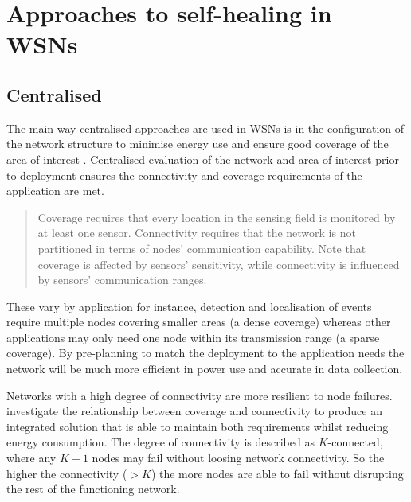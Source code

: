 \documentclass[authoryearcitations]{UoYCSproject}
\begin{document}
\section{Approaches to self-healing in WSNs}



\subsection{Centralised}

The main way centralised approaches are used in WSNs is in the configuration of the network structure to minimise energy use and ensure good coverage of the area of interest \citep{Wang2003,Ding2005,Wang2005,Derr2013}. Centralised evaluation of the network and area of interest prior to deployment ensures the connectivity and coverage requirements of the application are met.
\begin{quote}
Coverage requires that every location in the sensing field is monitored by at least one sensor. Connectivity requires that the network is not partitioned in terms of nodes' communication capability. Note that coverage is affected by sensors' sensitivity, while connectivity is influenced by sensors' communication ranges.
\citep{Wang2005}
\end{quote}
These vary by application for instance, detection and localisation of events require multiple nodes covering smaller areas (a dense coverage) whereas other applications may only need one node within its transmission range (a sparse coverage). By pre-planning to match the deployment to the application needs the network will be much more efficient in power use and accurate in data collection.

Networks with a high degree of connectivity are more resilient to node failures.  investigate the relationship between coverage and connectivity to produce an integrated solution that is able to maintain both requirements whilst reducing energy consumption. The degree of connectivity is described as $K$-connected, where any $K-1$ nodes may fail without loosing network connectivity. So the higher the connectivity ($>K$) the more nodes are able to fail without disrupting the rest of the functioning network.

\end{document}
